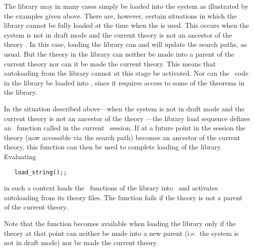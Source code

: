 The  library may in many cases simply be loaded into the system as
illustrated by the examples given above.  There are, however, certain
situations in which the  library cannot be fully loaded at the time
when the  is used.  This occurs when the system is not in
draft mode and the current theory is not an ancestor of the theory .
In this case, loading the library can and will update the search paths, as
usual. But the  theory in the library can neither be made into a
parent of the current theory nor can it be made the current theory.  This means
that autoloading from the library cannot at this stage be activated.  Nor can
the \ML\ code in the library be loaded into \HOL, since it requires access to
some of the theorems in the library.

In the situation described above---when the system is not in draft mode and the
current theory is not an ancestor of the theory ---the library load
sequence defines an \ML\ function called  in the current \HOL\
session.  If at a future point in the session the  theory (now
accessible via the search path) becomes an ancestor of the current theory, this
function can then be used to complete loading of the library. Evaluating

\begin{hol}\begin{verbatim}
   load_string();;
\end{verbatim}\end{hol}

\noindent in such a context loads the \ML\ functions of the  library
into \HOL\ and activates autoloading from its theory files.  The function
\ml{load\_string} fails if the theory  is not a parent of the
current theory.

Note that the function  becomes available when loading the
 library only if the \ml{string} theory at that point can neither be
made into a new parent (i.e.\ the system is not in draft mode) nor be made the
current theory.


